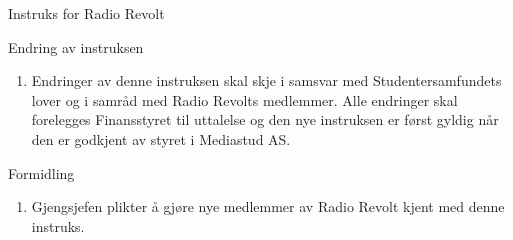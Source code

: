 \begin{instruks*}{Instruks for Radio Revolt}
    \begin{instruksledd}{Endring av instruksen}
        \begin{enumerate}
            \item Endringer av denne instruksen skal skje i samsvar med Studentersamfundets
                lover og i samråd med Radio Revolts medlemmer. Alle endringer skal forelegges Finansstyret til
                uttalelse og den nye instruksen er først gyldig når den er godkjent av styret i Mediastud AS.
        \end{enumerate}
    \end{instruksledd}
    
    \begin{instruksledd}{Formidling}
        \begin{enumerate}
            \item Gjengsjefen plikter å gjøre nye medlemmer av Radio Revolt kjent med denne
                instruks.
        \end{enumerate}
    \end{instruksledd}

\end{instruks*}


